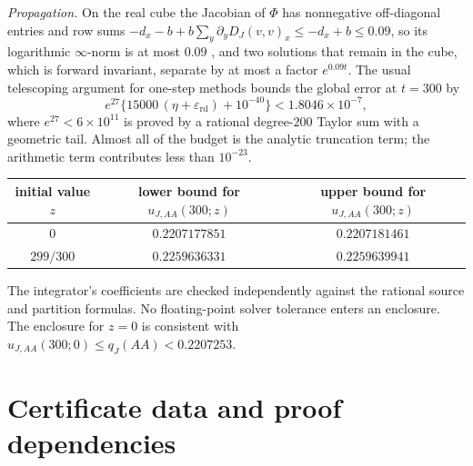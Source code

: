 \documentclass[11pt]{article}
\theoremstyle{remark}
\begin{document}
\emph{Propagation.} On the real cube the Jacobian of $\Phi$ has nonnegative
off-diagonal entries and row sums $-d_x-b+b\sum_y\partial_yD_J(v,v)_x\le-d_x+b\le0.09$,
so its logarithmic $\infty$-norm is at most $0.09$ \cite{soderlind2006}, and
two solutions that remain in the cube, which is forward invariant, separate
by at most a factor $e^{0.09t}$. The usual telescoping argument for one-step
methods \cite{nedialkov1999} bounds the global error at $t=300$ by
\[
 e^{27}\bigl\{15000\,(\eta+\varepsilon_{\mathrm{rd}})+10^{-40}\bigr\}<1.8046\times10^{-7},
\]
where $e^{27}<6\times10^{11}$ is proved by a rational degree-$200$ Taylor sum
with a geometric tail. Almost all of the budget is the analytic truncation
term; the arithmetic term contributes less than $10^{-23}$.

\begin{center}
\begin{tabular}{ccc}
\toprule
initial value $z$ & lower bound for $u_{J,AA}(300;z)$ & upper bound for $u_{J,AA}(300;z)$\\\midrule
$0$ & $0.2207177851$ & $0.2207181461$\\
$299/300$ & $0.2259636331$ & $0.2259639941$\\\bottomrule
\end{tabular}
\end{center}
The integrator's coefficients are checked independently against the rational
source and partition formulas. No floating-point solver tolerance enters an
enclosure. The enclosure for $z=0$ is consistent with
$u_{J,AA}(300;0)\le q_J(AA)<0.2207253$.

\section{Certificate data and proof dependencies}\label{app:data}
\end{document}
